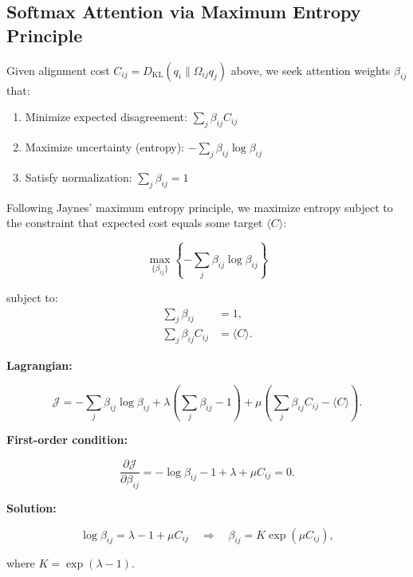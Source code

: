 \documentclass[11pt]{article}
\begin{document}
\subsection{Softmax Attention via Maximum Entropy Principle}
Given alignment cost $C_{ij} = D_{\mathrm{KL}}(q_i \| \Omega_{ij}q_j)$ above, we seek attention weights $\beta_{ij}$ that:

\begin{enumerate}
  \item Minimize expected disagreement: $\sum_j \beta_{ij} C_{ij}$
  \item Maximize uncertainty (entropy): $-\sum_j \beta_{ij}\log\beta_{ij}$
  \item Satisfy normalization: $\sum_j \beta_{ij} = 1$
\end{enumerate}

Following Jaynes' maximum entropy principle, we maximize entropy subject to the constraint that expected cost equals some target $\langle C \rangle$:

\begin{equation}
\max_{\{\beta_{ij}\}} \left\{-\sum_j \beta_{ij}\log\beta_{ij}\right\}
\end{equation}

subject to:\\
\begin{align}
\sum_j \beta_{ij} &= 1, \\
\sum_j \beta_{ij} C_{ij} &= \langle C \rangle.
\end{align}

\textbf{Lagrangian:}

\begin{equation}
\mathcal{J} = -\sum_j \beta_{ij}\log\beta_{ij} + \lambda\left(\sum_j \beta_{ij} - 1\right) + \mu\left(\sum_j \beta_{ij} C_{ij} - \langle C \rangle\right).
\end{equation}

\textbf{First-order condition:}

\begin{equation}
\frac{\partial \mathcal{J}}{\partial \beta_{ij}} = -\log\beta_{ij} - 1 + \lambda + \mu C_{ij} = 0.
\end{equation}

\textbf{Solution:}

\begin{equation}
\log\beta_{ij} = \lambda - 1 + \mu C_{ij}
\quad \Rightarrow \quad
\beta_{ij} = K \exp(\mu C_{ij}),
\end{equation}

where $K = \exp(\lambda - 1)$.
\end{document}
